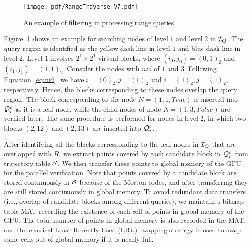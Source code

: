 \documentclass[10pt,conference,letterpaper]{IEEEtran}
\newcommand{\rangeq}{{{\cal Q}_r}\xspace}
\newcommand{\rangecand}{{{\cal Q}_r^c}\xspace}
\newcommand{\trajtable}{{\cal S}\xspace}
\newcommand{\treeindex}{{{\cal I}_Q}\xspace}
\begin{document}
\begin{figure}[t]
	\centering
	\texttt{[image: pdf/RangeTraverse\_V7.pdf]}
	\caption{An example of filtering in processing range queries \label{fig:RangeFilter}}
	\vspace{-.1in}
\end{figure}

Figure~\ref{fig:RangeFilter} shows an example for searching nodes of level $1$ and level $2$ in $\treeindex$. The query region is identified as the yellow dash line in level $1$ and blue dash line in level $2$. Level $1$ involves $2^1\times 2^1$ virtual blocks, where $(i_0,j_0)=(0, 1)_2$ and $(i_1,j_1)=(1, 1)_2$. Consider the nodes with $nid$ of $1$ and $3$. Following Equation~\ref{eq:nid}, we have $i=(0)_2, j=(1)_2$ and $i=(1)_2, j=(1)_2$, respectively. Hence, the blocks corresponding to these nodes overlap the query region. The block corresponding to the node $N=(1,1,True)$ is inserted into $\rangecand$ as it is a leaf node, while the child nodes of node $N=(1,3,False)$ are verified later. The same procedure is performed for nodes in level $2$, in which two blocks $(2,12)$ and $(2,13)$ are inserted into $\rangecand$.

After identifying all the blocks corresponding to the leaf nodes in $\treeindex$ that are overlapped with $R$, we extract points covered by each candidate block in $\rangecand$ from trajectory table $\trajtable$. We then transfer these points to global memory of the GPU for the parallel verification. Note that points covered by a candidate block are stored continuously in $\trajtable$ because of the Morton codes, and after transferring they are still stored continuously in global memory.
To avoid redundant data transfers (i.e., overlap of candidate blocks among different queries), we maintain a bitmap table MAT recording the existence of each cell of points in global memory of the GPU.
The total number of points in global memory is also recorded in the MAT, and the classical Least Recently Used (LRU) swapping strategy is used to swap some cells out of global memory if it is nearly full.
\end{document}
